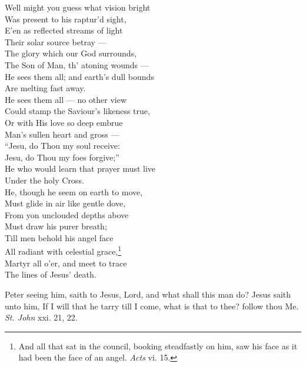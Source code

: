  Well might you guess what vision bright \\
 Was present to his raptur’d sight, \\
 E’en as reflected streams of light \\
 Their solar source betray — \\
 The glory which our God surrounds, \\
 The Son of Man, th’ atoning wounds — \\
 He sees them all; and earth’s dull bounds \\
 Are melting fast away. \\
  He sees them all — no other view \\
 Could stamp the Saviour’s likeness true, \\
 Or with His love so deep embrue \\
 Man’s sullen heart and gross — \\
 “Jesu, do Thou my soul receive: \\
 Jesu, do Thou my foes forgive;” \\
 He who would learn that prayer must live \\
 Under the holy Cross. \\
  He, though he seem on earth to move, \\
 Must glide in air like gentle dove, \\
 From yon unclouded depths above \\
 Must draw his purer breath; \\
 Till men behold his angel face \\
 All radiant with celestial grace,\footnote{And all that sat in the council, booking steadfastly on him, saw his face as it had been the face of an angel. \emph{Acts} vi. 15.} \\
 Martyr all o’er, and meet to trace \\
 The lines of Jesus’ death.\\


Peter seeing him, saith to Jesus, Lord, and what shall this man do? Jesus saith unto him, If I will that he tarry till I come, what is that to thee? follow thou Me. \emph{St. John} xxi. 21, 22.

